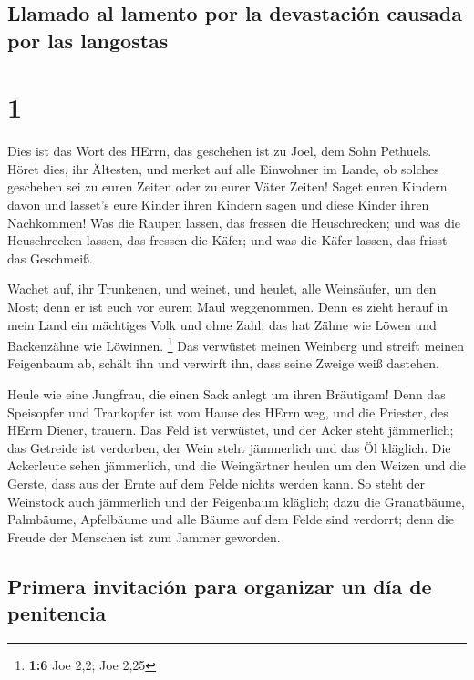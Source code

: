 \hypertarget{llamado-al-lamento-por-la-devastaciuxf3n-causada-por-las-langostas}{%
\subsection{Llamado al lamento por la devastación causada por las
langostas}\label{llamado-al-lamento-por-la-devastaciuxf3n-causada-por-las-langostas}}

\hypertarget{section}{%
\section{1}\label{section}}

 Dies ist das Wort des HErrn, das geschehen ist zu Joel,
dem Sohn Pethuels.  Höret dies, ihr Ältesten, und merket
auf alle Einwohner im Lande, ob solches geschehen sei zu euren Zeiten
oder zu eurer Väter Zeiten!  Saget euren Kindern davon und
lasset's eure Kinder ihren Kindern sagen und diese Kinder ihren
Nachkommen!  Was die Raupen lassen, das fressen die
Heuschrecken; und was die Heuschrecken lassen, das fressen die Käfer;
und was die Käfer lassen, das frisst das Geschmeiß.

 Wachet auf, ihr Trunkenen, und weinet, und heulet, alle
Weinsäufer, um den Most; denn er ist euch vor eurem Maul weggenommen.
 Denn es zieht herauf in mein Land ein mächtiges Volk und
ohne Zahl; das hat Zähne wie Löwen und Backenzähne wie Löwinnen.
\footnote{\textbf{1:6} Joe 2,2; Joe 2,25}  Das verwüstet
meinen Weinberg und streift meinen Feigenbaum ab, schält ihn und
verwirft ihn, dass seine Zweige weiß dastehen.

 Heule wie eine Jungfrau, die einen Sack anlegt um ihren
Bräutigam!  Denn das Speisopfer und Trankopfer ist vom
Hause des HErrn weg, und die Priester, des HErrn Diener, trauern.
 Das Feld ist verwüstet, und der Acker steht jämmerlich;
das Getreide ist verdorben, der Wein steht jämmerlich und das Öl
kläglich.  Die Ackerleute sehen jämmerlich, und die
Weingärtner heulen um den Weizen und die Gerste, dass aus der Ernte auf
dem Felde nichts werden kann.  So steht der Weinstock
auch jämmerlich und der Feigenbaum kläglich; dazu die Granatbäume,
Palmbäume, Apfelbäume und alle Bäume auf dem Felde sind verdorrt; denn
die Freude der Menschen ist zum Jammer geworden.

\hypertarget{primera-invitaciuxf3n-para-organizar-un-duxeda-de-penitencia}{%
\subsection{Primera invitación para organizar un día de
penitencia}\label{primera-invitaciuxf3n-para-organizar-un-duxeda-de-penitencia}}

